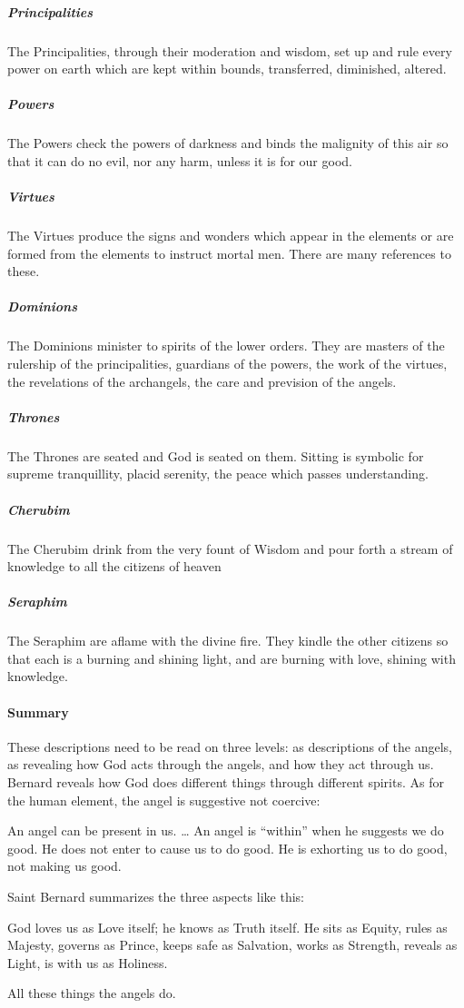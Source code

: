 \subparagraph{Principalities}
The Principalities, through their moderation and wisdom, set up and rule every power on earth which are kept within bounds, transferred, diminished, altered.

\subparagraph{Powers}
The Powers check the powers of darkness and binds the malignity of this air so that it can do no evil, nor any harm, unless it is for our good.

\subparagraph{Virtues}
The Virtues produce the signs and wonders which appear in the elements or are formed from the elements to instruct mortal men. There are many references to these.

\subparagraph{Dominions}
The Dominions minister to spirits of the lower orders. They are masters of the rulership of the principalities, guardians of the powers, the work of the virtues, the revelations of the archangels, the care and prevision of the angels.

\subparagraph{Thrones}
The Thrones are seated and God is seated on them. Sitting is symbolic for supreme tranquillity, placid serenity, the peace which passes understanding.

\subparagraph{Cherubim}
The Cherubim drink from the very fount of Wisdom and pour forth a stream of knowledge to all the citizens of heaven

\subparagraph{Seraphim}
The Seraphim are aflame with the divine fire. They kindle the other citizens so that each is a burning and shining light, and are burning with love, shining with knowledge.

\paragraph{Summary}
These descriptions need to be read on three levels: as descriptions of the angels, as revealing how God acts through the angels, and how they act through us. Bernard reveals how God does different things through different spirits. As for the human element, the angel is suggestive not coercive:

\begin{quotex}
An angel can be present in us. … An angel is “within” when he suggests we do good. He does not enter to cause us to do good. He is exhorting us to do good, not making us good.

\end{quotex}
Saint Bernard summarizes the three aspects like this:

\begin{quotex}
God loves us as Love itself; he knows as Truth itself. He sits as Equity, rules as Majesty, governs as Prince, keeps safe as Salvation, works as Strength, reveals as Light, is with us as Holiness.

\end{quotex}
All these things the angels do.

